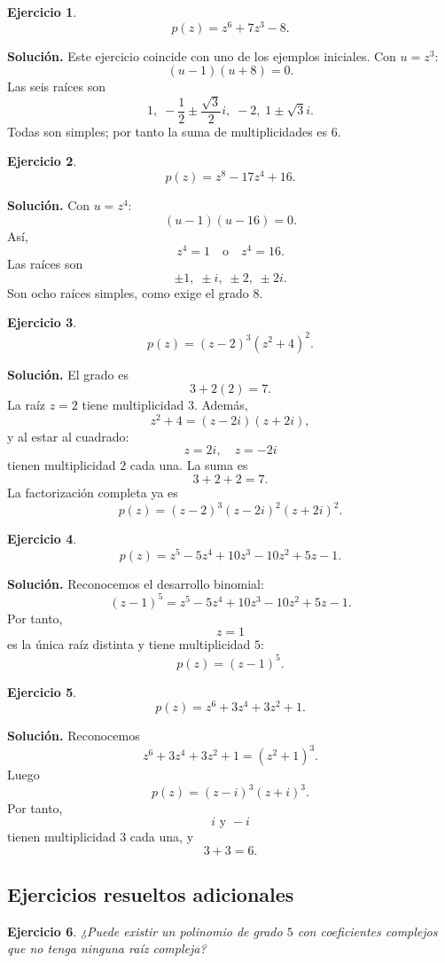 \documentclass[12pt]{article}
\newtheorem{ejercicio}{Ejercicio}[section]
\begin{document}
\begin{ejercicio}
\[
p(z)=z^6+7z^3-8.
\]
\end{ejercicio}

\textbf{Solución.}
Este ejercicio coincide con uno de los ejemplos iniciales. Con $u=z^3$:
\[
(u-1)(u+8)=0.
\]
Las seis raíces son
\[
1,\;
-\frac12\pm\frac{\sqrt3}{2}i,\;
-2,\;
1\pm\sqrt3 i.
\]
Todas son simples; por tanto la suma de multiplicidades es $6$.

\begin{ejercicio}
\[
p(z)=z^8-17z^4+16.
\]
\end{ejercicio}

\textbf{Solución.}
Con $u=z^4$:
\[
(u-1)(u-16)=0.
\]
Así,
\[
z^4=1\quad\text{o}\quad z^4=16.
\]
Las raíces son
\[
\boxed{\pm1,\;\pm i,\;\pm2,\;\pm2i.}
\]
Son ocho raíces simples, como exige el grado $8$.

\begin{ejercicio}
\[
p(z)=(z-2)^3(z^2+4)^2.
\]
\end{ejercicio}

\textbf{Solución.}
El grado es
\[
3+2(2)=7.
\]
La raíz $z=2$ tiene multiplicidad $3$. Además,
\[
z^2+4=(z-2i)(z+2i),
\]
y al estar al cuadrado:
\[
z=2i,\quad z=-2i
\]
tienen multiplicidad $2$ cada una. La suma es
\[
3+2+2=7.
\]
La factorización completa ya es
\[
\boxed{
p(z)=(z-2)^3(z-2i)^2(z+2i)^2.
}
\]

\begin{ejercicio}
\[
p(z)=z^5-5z^4+10z^3-10z^2+5z-1.
\]
\end{ejercicio}

\textbf{Solución.}
Reconocemos el desarrollo binomial:
\[
(z-1)^5
=z^5-5z^4+10z^3-10z^2+5z-1.
\]
Por tanto,
\[
\boxed{z=1}
\]
es la única raíz distinta y tiene multiplicidad $5$:
\[
\boxed{p(z)=(z-1)^5.}
\]

\begin{ejercicio}
\[
p(z)=z^6+3z^4+3z^2+1.
\]
\end{ejercicio}

\textbf{Solución.}
Reconocemos
\[
z^6+3z^4+3z^2+1=(z^2+1)^3.
\]
Luego
\[
p(z)=(z-i)^3(z+i)^3.
\]
Por tanto,
\[
\boxed{i\text{ y }-i}
\]
tienen multiplicidad $3$ cada una, y
\[
3+3=6.
\]
\subsection*{Ejercicios resueltos adicionales}
\begin{ejercicio}
¿Puede existir un polinomio de grado $5$ con coeficientes complejos que no
tenga ninguna raíz compleja?
\end{ejercicio}
\end{document}
